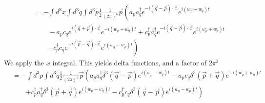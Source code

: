 \documentclass[working, oneside]{../../Preambles/tuftebook}
\begin{document}
\begin{solution}
\begin{align*}
&= - \int d^3x \int d^3q \int d^3p \frac{1}{2} \frac{1}{(2\pi)^6} \vec{p} \left( a_p a_q^\dagger e^{-i(\vec{q} - \vec{p}) \cdot \vec{x}} e^{i(w_p - w_q)t} \right. \\
&\qquad - a_p c_q e^{i(\vec{q} + \vec{p}) \cdot \vec{x}} e^{-i(w_p + w_q)t} + c_p^\dagger a_q^\dagger e^{-i(\vec{q} + \vec{p}) \cdot \vec{x}} e^{i(w_p + w_q)t} \\
&\qquad \left. - c_p^\dagger c_q e^{-i(\vec{p} - \vec{q}) \cdot \vec{x}} e^{i(w_q - w_p)t} \right)
\end{align*}
We apply the $x$ integral. This yields delta functions, and a factor of $2\pi^{3}$
\begin{align*}
&= - \int d^3p \int d^3q \frac{1}{2} \frac{1}{(2\pi)^3} \vec{p} \left( a_p a_q^\dagger \delta^3(\vec{q} - \vec{p}) e^{i(w_p - w_q)t} - a_p c_q \delta^3(\vec{p} + \vec{q}) e^{-i(w_p + w_q)t} \right. \\
&\qquad \left. + c_p^\dagger a_q^\dagger \delta^3(\vec{p} + \vec{q}) e^{i(w_p + w_q)t} - c_p^\dagger c_q \delta^3(\vec{q} - \vec{p}) e^{i(w_q - w_p)t} \right)
\end{align*}


\end{solution}
\end{document}
